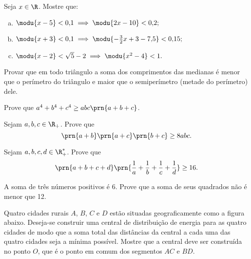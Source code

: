 \begin{exercise}
Seja $x \in \R$. Mostre que:
\begin{enumerate}[a.]
    \item $\modu{x-5}<0{,}1 \implies \modu{2x - 10}< 0{,}2;$
    \item $\modu{x+3}<0{,}1 \implies \modu{-\frac 3 2 x + 3 -
    7{,}5}<0{,}15;$
  \item $\modu{x-2}< \sqrt{5} - 2 \implies \modu{x^2 - 4}< 1.$
\end{enumerate}
\end{exercise}


\begin{exercise}
Provar que em todo triângulo a soma dos comprimentos das
medianas é menor que o perímetro do triângulo e maior que o
semiperímetro (metade do perímetro) dele.
\end{exercise}

\begin{exercise}
Prove que $a^4 +b^4 +c^4 \geq abc \prn{a+b+c}$.
\end{exercise}

\begin{exercise}
Sejam $a, b, c \in \R_+$. Prove que $$\prn {a+b} \prn {a+c}
\prn {b+c} \geq 8abc.$$
\end{exercise}

\begin{exercise}
Sejam $a, b, c, d \in \R_+^*$. Prove que $$\prn {a+b+c+d}
\prn {\frac 1 a + \frac 1 b + \frac 1 c + \frac 1 d} \geq 16.$$
\end{exercise}


\begin{exercise}
A soma de três números positivos é 6. Prove que a soma de seus
quadrados não é menor que 12.
\end{exercise}

\begin{exercise}
Quatro cidades rurais $A$, $B$, $C$ e $D$ estão situadas geograficamente como a figura abaixo.
Deseja-se construir uma central de distribuição de energia para as
quatro cidades de modo que a soma total das distâncias da central a
cada uma das quatro cidades seja a mínima possível. Mostre que a
central deve ser construída no ponto $O$, que é o ponto em comum dos
segmentos $AC$ e $BD$.
\end{exercise}